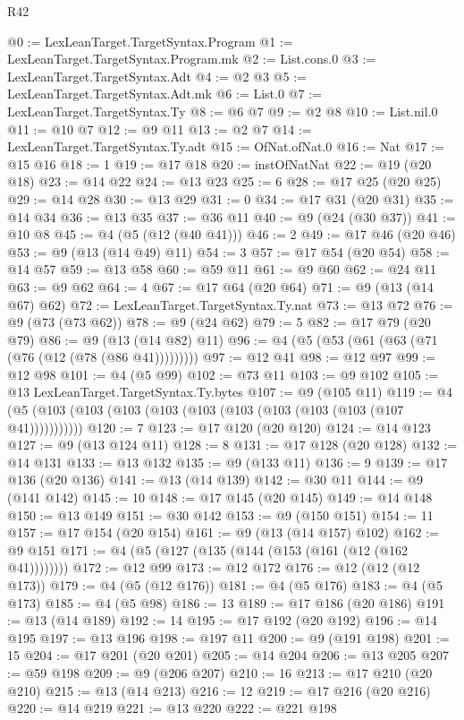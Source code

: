 \begin{lexlean}{R42}
\begin{coremodule}
@0 := LexLeanTarget.TargetSyntax.Program
@1 := LexLeanTarget.TargetSyntax.Program.mk
@2 := List.cons.{0}
@3 := LexLeanTarget.TargetSyntax.Adt
@4 := @2 @3
@5 := LexLeanTarget.TargetSyntax.Adt.mk
@6 := List.{0}
@7 := LexLeanTarget.TargetSyntax.Ty
@8 := @6 @7
@9 := @2 @8
@10 := List.nil.{0}
@11 := @10 @7
@12 := @9 @11
@13 := @2 @7
@14 := LexLeanTarget.TargetSyntax.Ty.adt
@15 := OfNat.ofNat.{0}
@16 := Nat
@17 := @15 @16
@18 := 1
@19 := @17 @18
@20 := instOfNatNat
@22 := @19 (@20 @18)
@23 := @14 @22
@24 := @13 @23
@25 := 6
@28 := @17 @25 (@20 @25)
@29 := @14 @28
@30 := @13 @29
@31 := 0
@34 := @17 @31 (@20 @31)
@35 := @14 @34
@36 := @13 @35
@37 := @36 @11
@40 := @9 (@24 (@30 @37))
@41 := @10 @8
@45 := @4 (@5 (@12 (@40 @41)))
@46 := 2
@49 := @17 @46 (@20 @46)
@53 := @9 (@13 (@14 @49) @11)
@54 := 3
@57 := @17 @54 (@20 @54)
@58 := @14 @57
@59 := @13 @58
@60 := @59 @11
@61 := @9 @60
@62 := @24 @11
@63 := @9 @62
@64 := 4
@67 := @17 @64 (@20 @64)
@71 := @9 (@13 (@14 @67) @62)
@72 := LexLeanTarget.TargetSyntax.Ty.nat
@73 := @13 @72
@76 := @9 (@73 (@73 @62))
@78 := @9 (@24 @62)
@79 := 5
@82 := @17 @79 (@20 @79)
@86 := @9 (@13 (@14 @82) @11)
@96 := @4 (@5 (@53 (@61 (@63 (@71 (@76 (@12 (@78 (@86 @41)))))))))
@97 := @12 @41
@98 := @12 @97
@99 := @12 @98
@101 := @4 (@5 @99)
@102 := @73 @11
@103 := @9 @102
@105 := @13 LexLeanTarget.TargetSyntax.Ty.bytes
@107 := @9 (@105 @11)
@119 := @4 (@5 (@103 (@103 (@103 (@103 (@103 (@103 (@103 (@103 (@103 (@107 @41)))))))))))
@120 := 7
@123 := @17 @120 (@20 @120)
@124 := @14 @123
@127 := @9 (@13 @124 @11)
@128 := 8
@131 := @17 @128 (@20 @128)
@132 := @14 @131
@133 := @13 @132
@135 := @9 (@133 @11)
@136 := 9
@139 := @17 @136 (@20 @136)
@141 := @13 (@14 @139)
@142 := @30 @11
@144 := @9 (@141 @142)
@145 := 10
@148 := @17 @145 (@20 @145)
@149 := @14 @148
@150 := @13 @149
@151 := @30 @142
@153 := @9 (@150 @151)
@154 := 11
@157 := @17 @154 (@20 @154)
@161 := @9 (@13 (@14 @157) @102)
@162 := @9 @151
@171 := @4 (@5 (@127 (@135 (@144 (@153 (@161 (@12 (@162 @41))))))))
@172 := @12 @99
@173 := @12 @172
@176 := @12 (@12 (@12 @173))
@179 := @4 (@5 (@12 @176))
@181 := @4 (@5 @176)
@183 := @4 (@5 @173)
@185 := @4 (@5 @98)
@186 := 13
@189 := @17 @186 (@20 @186)
@191 := @13 (@14 @189)
@192 := 14
@195 := @17 @192 (@20 @192)
@196 := @14 @195
@197 := @13 @196
@198 := @197 @11
@200 := @9 (@191 @198)
@201 := 15
@204 := @17 @201 (@20 @201)
@205 := @14 @204
@206 := @13 @205
@207 := @59 @198
@209 := @9 (@206 @207)
@210 := 16
@213 := @17 @210 (@20 @210)
@215 := @13 (@14 @213)
@216 := 12
@219 := @17 @216 (@20 @216)
@220 := @14 @219
@221 := @13 @220
@222 := @221 @198

\end{coremodule}
\end{lexlean}
